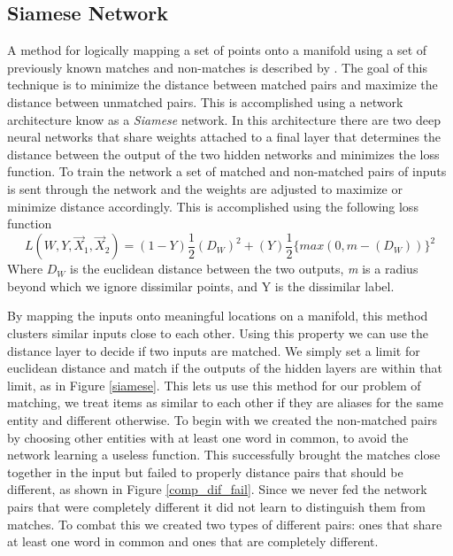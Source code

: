 \subsection{Siamese Network}

 A method for logically mapping a set of points onto a manifold using a set of previously known matches and non-matches is described by \cite{Hasdell:Siamese}. The goal of this technique is to minimize the distance between matched pairs and maximize the distance between unmatched pairs. This is accomplished using a network architecture know as a \textit{Siamese} network. In this architecture there are two deep neural networks that share weights attached to a final layer that determines the distance between the output of the two hidden networks and minimizes the loss function. To train the network a set of matched and non-matched pairs of inputs is sent through the network and the weights are adjusted to maximize or minimize distance accordingly. This is accomplished using the following loss function \[ L(W, Y, \vec{X}_1, \vec{X}_2) = (1 - Y)\frac{1}{2}(D_W)^2 + (Y)\frac{1}{2}\{max(0, m - (D_W))\}^2\] Where \(D_W\) is the euclidean distance between the two outputs, \textit{m} is a radius beyond which we ignore dissimilar points, and Y is the dissimilar label.

By mapping the inputs onto meaningful locations on a manifold, this method clusters similar inputs close to each other. Using this property we can use the distance layer to decide if two inputs are matched. We simply set a limit for euclidean distance and match if the outputs of the hidden layers are within that limit, as in Figure \ref{siamese}. This lets us use this method for our problem of matching, we treat items as similar to each other if they are aliases for the same entity and different otherwise. To begin with we created the non-matched pairs by choosing other entities with at least one word in common, to avoid the network learning a useless function. This successfully brought the matches close together in the input but failed to properly distance pairs that should be different, as shown in Figure \ref{comp_dif_fail}. Since we never fed the network pairs that were completely different it did not learn to distinguish them from matches. To combat this we created two types of different pairs: ones that share at least one word in common and ones that are completely different.

